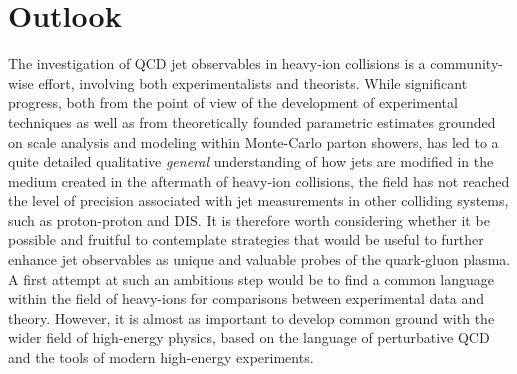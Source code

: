 
\section{Outlook}
\label{sec:outlook}

The investigation of QCD jet observables in heavy-ion collisions is a community-wise effort, involving both experimentalists and theorists. 
While significant progress, both from the point of view of the development of experimental techniques as well as from theoretically founded parametric estimates grounded on scale analysis and modeling within Monte-Carlo parton showers, has led to a quite detailed qualitative \textsl{general} understanding of how jets are modified in the medium created in the aftermath of heavy-ion collisions, the field has not reached the level of precision associated with jet measurements in other colliding systems, such as proton-proton and DIS.
It is therefore worth considering whether it be possible and fruitful to contemplate strategies that would be useful to further enhance jet observables as unique and valuable probes of the quark-gluon plasma.
A first attempt at such an ambitious step would be to find a common language within the field of heavy-ions for comparisons between experimental data and theory. However, it is almost as important to develop common ground with the wider field of high-energy physics, based on the language of perturbative QCD and the tools of modern high-energy experiments.


